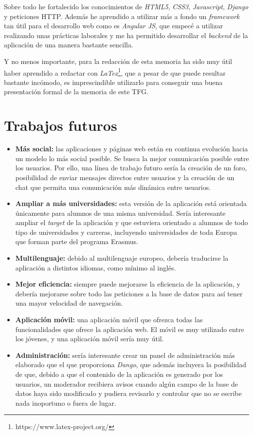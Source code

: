 \documentclass[a4paper, 12pt]{book}
\begin{document}
Sobre todo he fortalecido los conocimientos de \textit{HTML5}, \textit{CSS3}, \textit{Javascript}, \textit{Django} y peticiones HTTP. Además he aprendido a utilizar más a fondo un \textit{framework} tan útil para el desarrollo web como es \textit{Angular JS}, que empecé a utilizar realizando unas prácticas laborales y me ha permitido desarrollar el \textit{backend} de la aplicación de una manera bastante sencilla.
\newline

Y no menos importante, para la redacción de esta memoria ha sido muy útil haber aprendido a redactar con \textit{LaTex}\footnote{https://www.latex-project.org/}, que a pesar de que puede resultar bastante incómodo, es imprescindible utilizarlo para conseguir una buena presentación formal de la memoria de este TFG.



\section{Trabajos futuros}
\label{sec:trabajos_futuros}

\begin{itemize}
  \item \textbf{Más social:} las aplicaciones y páginas web están en continua evolución hacia un modelo lo más social posible. Se busca la mejor comunicación posible entre los usuarios. Por ello, una línea de trabajo futuro sería la creación de un foro, posibilidad de enviar mensajes directos entre usuarios y la creación de un chat que permita una comunicación más dinámica entre usuarios.
  \item \textbf{Ampliar a más universidades:} esta versión de la aplicación está orientada únicamente para alumnos de una misma universidad. Sería interesante ampliar el \textit{target} de la aplicación y que estuviera orientado a alumnos de todo tipo de universidades y carreras, incluyendo universidades de toda Europa que forman parte del programa Erasmus.
  \item \textbf{Multilenguaje:} debido al multilenguaje europeo, debería traducirse la aplicación a distintos idiomas, como mínimo al inglés.
  \item \textbf{Mejor eficiencia:} siempre puede mejorarse la eficiencia de la aplicación, y debería mejorarse sobre todo las peticiones a la base de datos para así tener una mayor velocidad de navegación.
  \item \textbf{Aplicación móvil:} una aplicación móvil que ofrezca todas las funcionalidades que ofrece la aplicación web. El móvil es muy utilizado entre los jóvenes, y una aplicación móvil sería muy útil.
  \item \textbf{Administración:} sería interesante crear un panel de administración más elaborado que el que proporciona \textit{Dango}, que además incluyera la posibilidad de que, debido a que el contenido de la aplicación es generado por los usuarios, un moderador recibiera avisos cuando algún campo de la base de datos haya sido modificado y pudiera revisarlo y controlar que no se escribe nada inoportuno o fuera de lugar.
\end{itemize}
\end{document}
